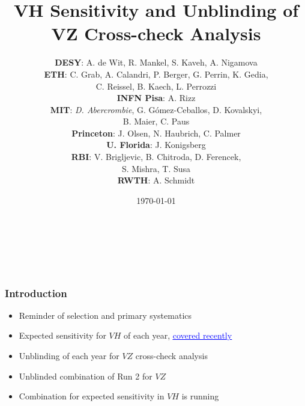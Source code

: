 \documentclass{beamer}
\author[D. Abercrombie]{
  {\bf DESY}: A. de Wit, R. Mankel, S. Kaveh, A. Nigamova \\
  \vfill
  {\bf ETH}: C. Grab, A. Calandri, P. Berger, G. Perrin, K. Gedia, \\
  \qquad \qquad C. Reissel, B. Kaech, L. Perrozzi \\
  \vfill
  {\bf INFN Pisa}: A. Rizz \\
  \vfill
  {\bf MIT}: \emph{D. Abercrombie}, G. G\'omez-Ceballos, D. Kovalskyi, \\
  \qquad \qquad B. Maier, C. Paus \\
  \vfill
  {\bf Princeton}: J. Olsen, N. Haubrich, C. Palmer \\
  \vfill
  {\bf U. Florida}: J. Konigsberg \\
  \vfill
  {\bf RBI}: V. Brigljevic, B. Chitroda, D. Ferencek, \\
  \qquad \qquad S. Mishra, T. Susa \\
  \vfill
  {\bf RWTH}: A. Schmidt \\
}
\title{\bf \sffamily VH Sensitivity and Unblinding of VZ Cross-check Analysis}
\date{\today}
\newcommand{\link}[2]{\href{#2}{\textcolor{blue}{\underline{#1}}}}
\begin{document}
\begin{frame}
  \begin{center}
  \inserttitle \\
  \end{center}
  \vfill
  \insertauthor \\
  \vfill
  \begin{center}
  \insertdate
  \end{center}
\end{frame}

\begin{frame}
  \frametitle{Introduction}

  \begin{itemize}
  \item Reminder of selection and primary systematics
  \item Expected sensitivity for $V\!H$ of each year,
    \link{covered recently}{https://indico.cern.ch/event/961164/#6-vhbb-hig-20-001-status}
  \item Unblinding of each year for $V\!Z$ cross-check analysis
  \item Unblinded combination of Run 2 for $V\!Z$
  \item Combination for expected sensitivity in $V\!H$ is running
  \end{itemize}

\end{frame}
\end{document}
